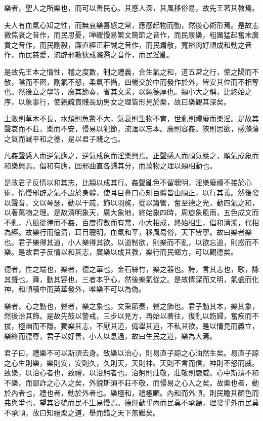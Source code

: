 樂者，聖人之所樂也，而可以善民心。其感人深，其風移俗易，故先王著其教焉。

夫人有血氣心知之性，而無哀樂喜怒之常，應感起物而動，然後心術形焉。是故志微焦衰之音作，而民思憂，啴緩慢易繁文簡節之音作，而民康樂，粗厲猛起奮末廣賁之音作，而民剛毅，廉直經正莊誠之音作，而民肅敬，寬裕肉好順成和動之音作，而民慈愛，流辟邪散狄成滌濫之音作，而民淫亂。

是故先王本之情性，稽之度數，制之禮義，合生氣之和，道五常之行，使之陽而不散，陰而不密，剛氣不怒，柔氣不懾，四暢交於中而發作於外，皆安其位而不相奪也。然後立之學等，廣其節奏，省其文采，以繩德厚也。類小大之稱，比終始之序，以象事行，使親疏貴賤長幼男女之理皆形見於樂，故曰樂觀其深矣。

土敝則草木不長，水煩則魚鱉不大，氣衰則生物不育，世亂則禮廢而樂淫。是故其聲哀而不莊，樂而不安，慢易以犯節，流湎以忘本。廣則容姦。狹則思欲，感滌蕩之氣而滅平和之德，是以君子賤之也。

凡姦聲感人而逆氣應之，逆氣成象而淫樂興焉。正聲感人而順氣應之，順氣成象而和樂興焉。倡和有應，回邪曲直各歸其分，而萬物之理以類相動也。

是故君子反情以和其志，比類以成其行。姦聲亂色不留聰明，淫樂廢禮不接於心術，惰慢邪辟之氣不設於身體，使耳目鼻口心知百體皆由順正，以行其義。然後發以聲音，文以琴瑟，動以干戚，飾以羽旄，從以簫管，奮至德之光，動四氣之和，以著萬物之理。是故清明象天，廣大象地，終始象四時，周旋象風雨，五色成文而不亂，八風從律而不姦，百度得數而有常，小大相成，終始相生，倡和清濁，代相為經。故樂行而倫清，耳目聰明，血氣和平，移風易俗，天下皆寧。故曰樂者樂也。君子樂得其道，小人樂得其欲。以道制欲，則樂而不亂，以欲忘道，則惑而不樂。是故君子反情以和其志，廣樂以成其教，樂行而民鄉方，可以觀德矣。

德者，性之端也，樂者，德之華也，金石絲竹，樂之器也。詩，言其志也，歌，詠其聲也，舞，動其容也，三者本乎心，然後樂氣從之。是故情深而文明，氣盛而化神，和順積中而英華發外，唯樂不可以為偽。

樂者，心之動也，聲者，樂之象也，文采節奏，聲之飾也。君子動其本，樂其象，然後治其飾。是故先鼓以警戒，三步以見方，再始以著往，復亂以飭歸，奮疾而不拔，極幽而不隱。獨樂其志，不厭其道，備舉其道，不私其欲。是以情見而義立，樂終而德尊，君子以好善，小人以息過，故曰生民之道，樂為大焉。

君子曰，禮樂不可以斯須去身。致樂以治心，則易直子諒之心油然生矣。易直子諒之心生則樂，樂則安，安則久，久則天，天則神。天則不言而信，神則不怒而威。致樂，以治心者也，致禮，以治躬者也。治躬則莊敬，莊敬則嚴威。心中斯須不和不樂，而鄙詐之心入之矣，外貌斯須不莊不敬，而慢易之心入之矣。故樂也者，動於內者也，禮也者，動於外者也。樂極和，禮極順。內和而外順，則民瞻其顏色而弗與爭也，望其容貌而民不生易慢焉。德煇動乎內而民莫不承聽，理發乎外而民莫不承順，故曰知禮樂之道，舉而錯之天下無難矣。


